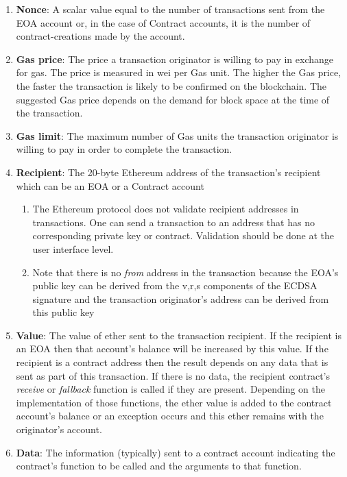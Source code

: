\begin{enumerate}
\item\textbf{Nonce}: A scalar value equal to the number of transactions sent from the EOA account or, in the case of Contract accounts, it is the number of contract-creations made by the account.

\item\textbf{Gas price}: The price a transaction originator is willing to pay in exchange for gas. The price is measured in wei per Gas unit. The higher the Gas price, the faster the transaction is likely to be confirmed on the blockchain. The suggested Gas price depends on the demand for block space at the time of the transaction.

\item\textbf{Gas limit}: The maximum number of Gas units the transaction originator is willing to pay in order to complete the transaction.

\item\textbf{Recipient}:  The 20-byte Ethereum address of the transaction's recipient which can be an EOA or a Contract account
\begin{enumerate}
\item The Ethereum protocol does not validate recipient addresses in transactions. One can send a transaction to an address that has no corresponding private key or contract. Validation should be done at the user interface level.
\item Note that there is no \textit{from} address in the transaction because the EOA's public key can be derived from the v,r,s components of the ECDSA signature and the transaction originator's address can be derived from this public key
\end{enumerate}

\item\textbf{Value}: The value of ether sent to the transaction recipient. If the recipient is an EOA then that account's balance will be increased by this value. If the recipient is a contract address then the result depends on any data that is sent as part of this transaction. If there is no data, the recipient contract's \textit{receive} or \textit{fallback} function is called if they are present. Depending on the implementation of those functions, the ether value is added to the contract account's balance or an exception occurs and this ether remains with the originator's account.

\item\textbf{Data}: The information (typically) sent to a contract account indicating the contract's function to be called and the arguments to that function.


\end{enumerate}
